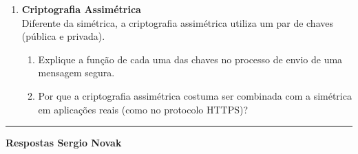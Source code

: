 \documentclass[12pt]{article}
\begin{document}
\begin{enumerate}
    \vspace{0.4cm}

    \item \textbf{Criptografia Assimétrica} \\
    Diferente da simétrica, a criptografia assimétrica utiliza um par de chaves (pública e privada).
    \begin{enumerate}[label=\alph*), leftmargin=0.8cm, topsep=2pt]
        \item Explique a função de cada uma das chaves no processo de envio de uma mensagem segura.
        \item Por que a criptografia assimétrica costuma ser combinada com a simétrica em aplicações reais (como no protocolo HTTPS)?
    \end{enumerate}

\end{enumerate}

\vspace{1cm}
\hrule
\vspace{0.5cm}

\begin{center}
    \textcolor{meuazul}{\Large \textbf{Respostas Sergio Novak}}
\end{center}

\vspace{0.5cm}
\end{document}

